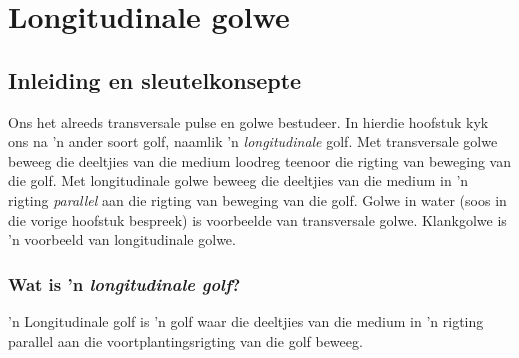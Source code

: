 \chapter{Longitudinale golwe}

    \setcounter{figure}{1}
    \setcounter{subfigure}{1}
    \label{e91550bed2a1600e0ddb2572d580bf8e}
         \section{Inleiding en sleutelkonsepte}
    \nopagebreak
    \label{m38782*id291765}Ons het alreeds transversale pulse en golwe bestudeer.
    In hierdie hoofstuk kyk ons na 'n ander soort golf, naamlik 'n \textsl{longitudinale} golf.
    Met transversale golwe beweeg die deeltjies van die medium loodreg teenoor die rigting van beweging van die golf.
    Met longitudinale golwe beweeg die deeltjies van die medium in 'n rigting \textsl{parallel} aan die rigting van beweging van die golf. 
    Golwe in water (soos in die vorige hoofstuk bespreek) is voorbeelde van transversale golwe.
    Klankgolwe is 'n voorbeeld van longitudinale golwe.\par 
    \label{m38782*cid3}




            \subsection*{Wat is 'n \textsl{longitudinale golf}?}
            \nopagebreak
\par
{} {  'n Longitudinale golf is 'n golf waar die deeltjies van die medium in 'n rigting parallel aan die voortplantingsrigting van die golf beweeg.} 
      
